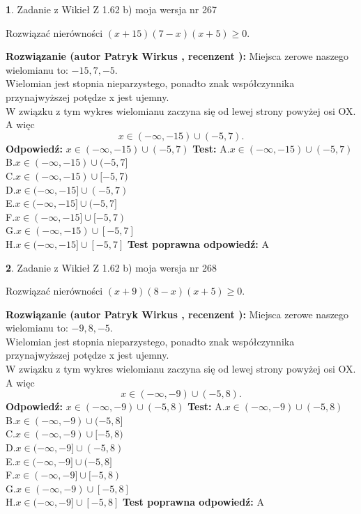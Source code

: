 \documentclass[12pt, a4paper]{article}
\theoremstyle{definition} %
\newtheorem{zad}{}
\newcommand{\zadStart}[1]{\begin{zad}#1\newline}
\newcommand{\zadStop}{\end{zad}}
\newcommand{\rozwStart}[2]{\noindent \textbf{Rozwiązanie (autor #1 , recenzent #2): }\newline}
\newcommand{\rozwStop}{\newline}
\newcommand{\odpStart}{\noindent \textbf{Odpowiedź:}\newline}
\newcommand{\odpStop}{\newline}
\newcommand{\testStart}{\noindent \textbf{Test:}\newline}
\newcommand{\testStop}{\newline}
\newcommand{\kluczStart}{\noindent \textbf{Test poprawna odpowiedź:}\newline}
\newcommand{\kluczStop}{\newline}
\begin{document}
\zadStart{Zadanie z Wikieł Z 1.62 b) moja wersja nr 267}

Rozwiązać nierówności $(x+15)(7-x)(x+5)\ge0$.
\zadStop
\rozwStart{Patryk Wirkus}{}
Miejsca zerowe naszego wielomianu to: $-15, 7, -5$.\\
Wielomian jest stopnia nieparzystego, ponadto znak współczynnika przy\linebreak najwyższej potędze x jest ujemny.\\ W związku z tym wykres wielomianu zaczyna się od lewej strony powyżej osi OX. A więc $$x \in (-\infty,-15) \cup (-5,7).$$
\rozwStop
\odpStart
$x \in (-\infty,-15) \cup (-5,7)$
\odpStop
\testStart
A.$x \in (-\infty,-15) \cup (-5,7)$\\
B.$x \in (-\infty,-15) \cup (-5,7]$\\
C.$x \in (-\infty,-15) \cup [-5,7)$\\
D.$x \in (-\infty,-15] \cup (-5,7)$\\
E.$x \in (-\infty,-15] \cup (-5,7]$\\
F.$x \in (-\infty,-15] \cup [-5,7)$\\
G.$x \in (-\infty,-15) \cup [-5,7]$\\
H.$x \in (-\infty,-15] \cup [-5,7]$
\testStop
\kluczStart
A
\kluczStop



\zadStart{Zadanie z Wikieł Z 1.62 b) moja wersja nr 268}

Rozwiązać nierówności $(x+9)(8-x)(x+5)\ge0$.
\zadStop
\rozwStart{Patryk Wirkus}{}
Miejsca zerowe naszego wielomianu to: $-9, 8, -5$.\\
Wielomian jest stopnia nieparzystego, ponadto znak współczynnika przy\linebreak najwyższej potędze x jest ujemny.\\ W związku z tym wykres wielomianu zaczyna się od lewej strony powyżej osi OX. A więc $$x \in (-\infty,-9) \cup (-5,8).$$
\rozwStop
\odpStart
$x \in (-\infty,-9) \cup (-5,8)$
\odpStop
\testStart
A.$x \in (-\infty,-9) \cup (-5,8)$\\
B.$x \in (-\infty,-9) \cup (-5,8]$\\
C.$x \in (-\infty,-9) \cup [-5,8)$\\
D.$x \in (-\infty,-9] \cup (-5,8)$\\
E.$x \in (-\infty,-9] \cup (-5,8]$\\
F.$x \in (-\infty,-9] \cup [-5,8)$\\
G.$x \in (-\infty,-9) \cup [-5,8]$\\
H.$x \in (-\infty,-9] \cup [-5,8]$
\testStop
\kluczStart
A
\kluczStop
\end{document}
